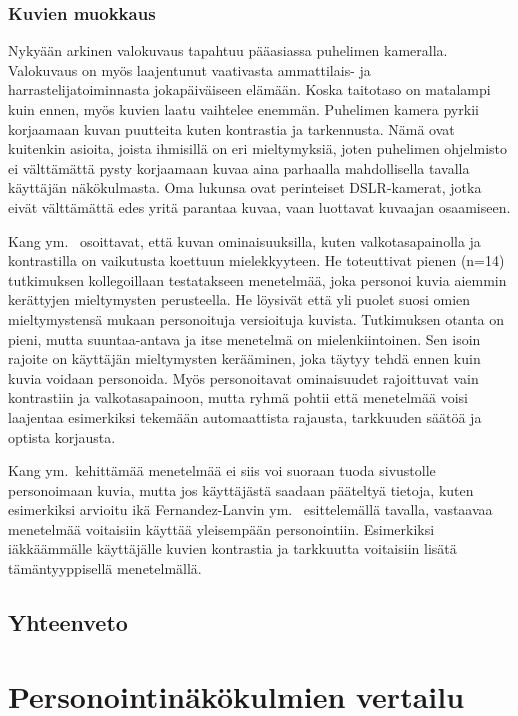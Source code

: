 \documentclass[finnish, 12pt, a4paper, elec, utf8, a-1b, online]{aaltothesis}
\begin{document}
\subsubsection{Kuvien muokkaus}

Nykyään arkinen valokuvaus tapahtuu pääasiassa puhelimen kameralla. Valokuvaus
on myös laajentunut vaativasta ammattilais- ja harrastelijatoiminnasta
jokapäiväiseen elämään. Koska taitotaso on matalampi kuin ennen, myös kuvien
laatu vaihtelee enemmän. Puhelimen kamera pyrkii korjaamaan kuvan puutteita
kuten kontrastia ja tarkennusta. Nämä ovat kuitenkin asioita, joista ihmisillä
on eri mieltymyksiä, joten puhelimen ohjelmisto ei välttämättä pysty korjaamaan
kuvaa aina parhaalla mahdollisella tavalla käyttäjän näkökulmasta. Oma lukunsa
ovat perinteiset DSLR-kamerat, jotka eivät välttämättä edes yritä parantaa
kuvaa, vaan luottavat kuvaajan osaamiseen.

Kang ym.~\cite{5539850} osoittavat, että kuvan ominaisuuksilla, kuten
valkotasapainolla ja kontrastilla on vaikutusta koettuun mielekkyyteen. He
toteuttivat pienen (n=14) tutkimuksen kollegoillaan testatakseen menetelmää,
joka personoi kuvia aiemmin kerättyjen mieltymysten perusteella. He löysivät
että yli puolet suosi omien mieltymystensä mukaan personoituja versioituja
kuvista. Tutkimuksen otanta on pieni, mutta suuntaa-antava ja itse menetelmä on
mielenkiintoinen. Sen isoin rajoite on käyttäjän mieltymysten kerääminen, joka
täytyy tehdä ennen kuin kuvia voidaan personoida. Myös personoitavat
ominaisuudet rajoittuvat vain kontrastiin ja valkotasapainoon, mutta ryhmä
pohtii että menetelmää voisi laajentaa esimerkiksi tekemään automaattista
rajausta, tarkkuuden säätöä ja optista korjausta.

Kang ym.~kehittämää menetelmää ei siis voi suoraan tuoda sivustolle
personoimaan kuvia, mutta jos käyttäjästä saadaan pääteltyä tietoja, kuten
esimerkiksi arvioitu ikä Fernandez-Lanvin ym.~\cite{fernandez2018dimension}
esittelemällä tavalla, vastaavaa menetelmää voitaisiin käyttää yleisempään
personointiin. Esimerkiksi iäkkäämmälle käyttäjälle kuvien kontrastia ja
tarkkuutta voitaisiin lisätä tämäntyyppisellä menetelmällä.

\subsection{Yhteenveto}

\clearpage

\section{Personointinäkökulmien vertailu}\label{personalization-comparison}
\end{document}
